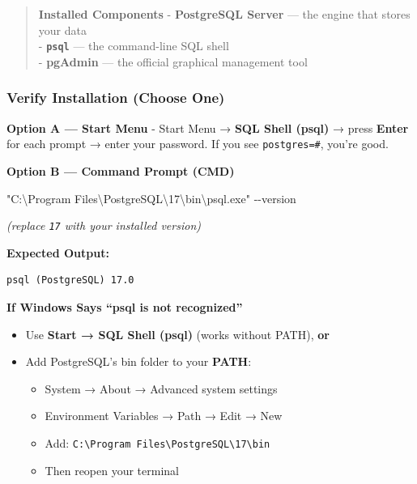 \documentclass[
  letterpaper,
  DIV=11,
  numbers=noendperiod]{scrartcl}
\newenvironment{Shaded}{\begin{snugshade}}{\end{snugshade}}
\newcommand{\NormalTok}[1]{\textcolor[rgb]{0.00,0.23,0.31}{#1}}
\newcommand{\StringTok}[1]{\textcolor[rgb]{0.13,0.47,0.30}{#1}}
\providecommand{\tightlist}{%
  \setlength{\itemsep}{0pt}\setlength{\parskip}{0pt}}\usepackage{longtable,booktabs,array}
\begin{document}
\begin{quote}
\textbf{Installed Components} - \textbf{PostgreSQL Server} --- the
engine that stores your data\\
- \textbf{\texttt{psql}} --- the command-line SQL shell\\
- \textbf{pgAdmin} --- the official graphical management tool
\end{quote}

\subsubsection{Verify Installation (Choose
One)}\label{verify-installation-choose-one}

\textbf{Option A --- Start Menu} - Start Menu → \textbf{SQL Shell
(psql)} → press \textbf{Enter} for each prompt → enter your password. If
you see \texttt{postgres=\#}, you're good.

\textbf{Option B --- Command Prompt (CMD)}

\begin{Shaded}
\begin{Highlighting}[]
\StringTok{"C:\textbackslash{}Program Files\textbackslash{}PostgreSQL\textbackslash{}17\textbackslash{}bin\textbackslash{}psql.exe"}\NormalTok{ {-}{-}version}
\end{Highlighting}
\end{Shaded}

\emph{(replace \texttt{17} with your installed version)}

\textbf{Expected Output:}

\begin{verbatim}
psql (PostgreSQL) 17.0
\end{verbatim}

\textbf{If Windows Says ``psql is not recognized''}

\begin{itemize}
\tightlist
\item
  Use \textbf{Start → SQL Shell (psql)} (works without PATH),
  \textbf{or}
\item
  Add PostgreSQL's bin folder to your \textbf{PATH}:

  \begin{itemize}
  \tightlist
  \item
    System → About → Advanced system settings
  \item
    Environment Variables → Path → Edit → New
  \item
    Add:
    \texttt{C:\textbackslash{}Program\ Files\textbackslash{}PostgreSQL\textbackslash{}17\textbackslash{}bin}
  \item
    Then reopen your terminal
  \end{itemize}
\end{itemize}
\end{document}
